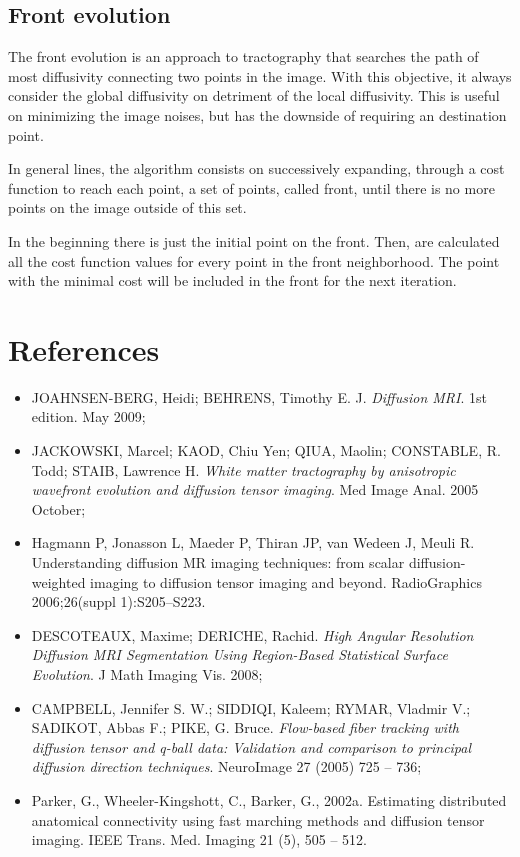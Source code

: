 \documentclass[a4paper,11pt]{report}
\begin{document}
  \section{Front evolution}
  The front evolution is an approach to tractography that searches the path of most diffusivity connecting two points in the image. With this objective, it always consider the global diffusivity on detriment of the local diffusivity. This is useful on minimizing the image noises, but has the downside of requiring an destination point.

  In general lines, the algorithm consists on successively expanding, through a cost function to reach each point, a set of points, called front, until there is no more points on the image outside of this set.

  In the beginning there is just the initial point on the front. Then, are calculated all the cost function values for every point in the front neighborhood. The point with the minimal cost will be included in the front for the next iteration.

\chapter{References} \label{ch: biblio}

\begin{itemize}
  \item JOAHNSEN-BERG, Heidi; BEHRENS, Timothy E. J. \textit{Diffusion MRI}. 1st edition. May 2009;
  \item JACKOWSKI, Marcel; KAOD, Chiu Yen; QIUA, Maolin; CONSTABLE, R. Todd; STAIB, Lawrence H. \textit{White matter tractography by anisotropic wavefront evolution and diffusion tensor imaging}. Med Image Anal. 2005 October;
  \item Hagmann P, Jonasson L, Maeder P, Thiran JP, van Wedeen J, Meuli R. Understanding diffusion MR imaging techniques: from scalar diffusion-weighted imaging to diffusion tensor imaging and beyond. RadioGraphics 2006;26(suppl 1):S205–S223.
  \item DESCOTEAUX, Maxime; DERICHE, Rachid. \textit{High Angular Resolution Diffusion MRI Segmentation Using
Region-Based Statistical Surface Evolution}. J Math Imaging Vis. 2008;
  \item CAMPBELL, Jennifer S. W.; SIDDIQI, Kaleem; RYMAR, Vladmir V.; SADIKOT, Abbas F.; PIKE, G. Bruce. \textit{Flow-based fiber tracking with diffusion tensor and q-ball data: Validation and comparison to principal diffusion direction techniques}. NeuroImage 27 (2005) 725 – 736;
  \item Parker, G., Wheeler-Kingshott, C., Barker, G., 2002a. Estimating distributed anatomical connectivity using fast marching methods and diffusion tensor imaging. IEEE Trans. Med. Imaging 21 (5), 505 – 512.
\end{itemize}
\end{document}
